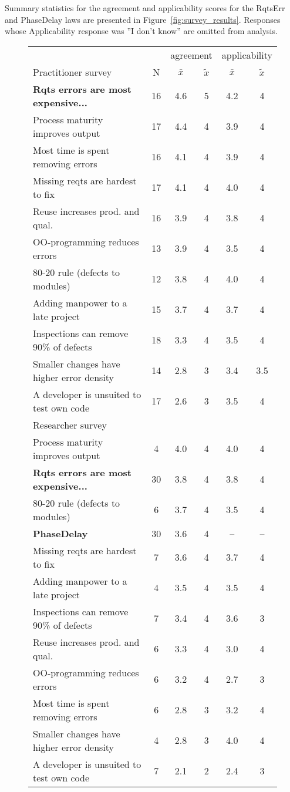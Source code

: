 Summary statistics for the agreement and applicability scores for the RqtsErr and PhaseDelay laws are presented in Figure~\ref{fig:survey_results}. Responses whose Applicability response was ''I don't know'' are omitted from analysis.


\begin{figure}[!ht] 
\scriptsize 
 
\begin{tabular}{l|c|c|c|c|c}
 &  & \multicolumn{2}{c}{agreement} & \multicolumn{2}{c}{applicability} \\\cline{1-1} 
Practitioner survey  & N & $\bar{x}$ & $\tilde{x}$ & $\bar{x}$ & $\tilde{x}$ \\
\hline 
\textbf{Rqts errors are most expensive...} & 16 & 4.6 & 5 & 4.2 & 4 \\ 
Process maturity improves output & 17 & 4.4 & 4 & 3.9 & 4 \\ 
Most time is spent removing errors & 16 & 4.1 & 4 & 3.9 & 4 \\ 
Missing reqts are hardest to fix & 17 & 4.1 & 4 & 4.0 & 4 \\
Reuse increases prod. and qual. & 16 & 3.9 & 4 & 3.8 & 4 \\
OO-programming reduces errors & 13 & 3.9 & 4 & 3.5 & 4 \\
80-20 rule (defects to modules) & 12 & 3.8 & 4 & 4.0 & 4 \\
Adding manpower to a late project & 15 & 3.7 & 4 & 3.7 & 4 \\
Inspections can remove 90\% of defects & 18 & 3.3 & 4 & 3.5 & 4 \\
Smaller changes have higher error density & 14 & 2.8 & 3 & 3.4 & 3.5 \\
A developer is unsuited to test own code & 17 & 2.6 & 3 & 3.5 & 4\\\hline
 
Researcher survey \\\hline 
Process maturity improves output & 4 & 4.0 & 4 & 4.0 & 4 \\
\textbf{Rqts errors are most expensive...} & 30 & 3.8 & 4 & 3.8 & 4   \\ 
80-20 rule (defects to modules) & 6 & 3.7 & 4 & 3.5 & 4 \\
\textbf{PhaseDelay} & 30 & 3.6 & 4 & -- & --  \\ 
Missing reqts are hardest to fix & 7 & 3.6 & 4 & 3.7 & 4 \\
Adding manpower to a late project & 4 & 3.5 & 4 & 3.5 & 4 \\
Inspections can remove 90\% of defects & 7 & 3.4 & 4 & 3.6 & 3 \\
Reuse increases prod. and qual. & 6 & 3.3 & 4 & 3.0 & 4 \\
OO-programming reduces errors & 6 & 3.2 & 4 & 2.7 & 3 \\
Most time is spent removing errors & 6 & 2.8 & 3 & 3.2 & 4 \\ 
Smaller changes have higher error density & 4 & 2.8 & 3 & 4.0 & 4 \\
A developer is unsuited to test own code & 7 & 2.1 & 2 & 2.4 & 3
\end{tabular} 
 

\end{figure}
